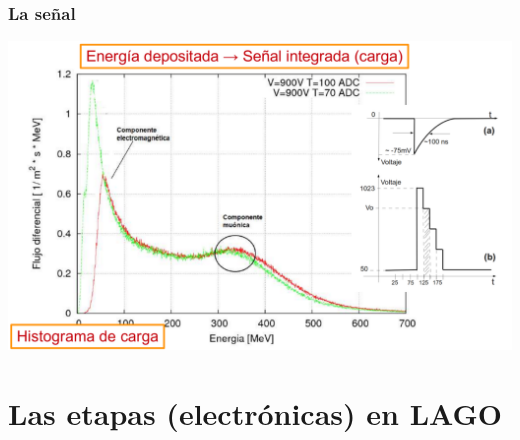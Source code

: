 \documentclass{beamer}
\begin{document}
\begin{frame}
				\frametitle{La señal}
												\includegraphics[width=\textwidth]{histo_carga_ha}
\end{frame} 

\section{Las etapas (electrónicas) en LAGO}
\end{document}
